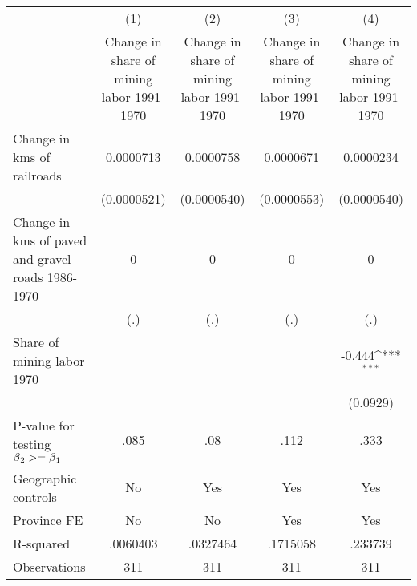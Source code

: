 {
\def\sym#1{\ifmmode^{#1}\else\(^{#1}\)\fi}
\begin{tabular}{l*{4}{c}}
\hline\hline
                &\multicolumn{1}{c}{(1)}&\multicolumn{1}{c}{(2)}&\multicolumn{1}{c}{(3)}&\multicolumn{1}{c}{(4)}\\
                &\multicolumn{1}{c}{Change in share of mining labor 1991-1970}&\multicolumn{1}{c}{Change in share of mining labor 1991-1970}&\multicolumn{1}{c}{Change in share of mining labor 1991-1970}&\multicolumn{1}{c}{Change in share of mining labor 1991-1970}\\
\hline
Change in kms of railroads&0.0000713         &0.0000758         &0.0000671         &0.0000234         \\
                &(0.0000521)         &(0.0000540)         &(0.0000553)         &(0.0000540)         \\
[1em]
Change in kms of paved and gravel roads 1986-1970&        0         &        0         &        0         &        0         \\
                &      (.)         &      (.)         &      (.)         &      (.)         \\
[1em]
Share of mining labor 1970&                  &                  &                  &   -0.444\sym{***}\\
                &                  &                  &                  & (0.0929)         \\
\hline
P-value for testing $\beta\\_2 >= \beta\\_1$&     .085         &      .08         &     .112         &     .333         \\
Geographic controls&       No         &      Yes         &      Yes         &      Yes         \\
Province FE     &       No         &       No         &      Yes         &      Yes         \\
R-squared       & .0060403         & .0327464         & .1715058         &  .233739         \\
Observations    &      311         &      311         &      311         &      311         \\
\hline\hline
\end{tabular}
}
